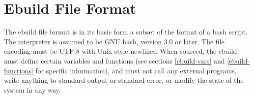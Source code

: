 \chapter{Ebuild File Format}
\label{ebuild-format}

The ebuild file format is in its basic form a subset of the format of a bash script. The interpreter
is assumed to be GNU bash, version 3.0 or later. The file encoding must be UTF-8 with Unix-style
newlines. When sourced, the
ebuild must define certain variables and functions (see sections \ref{ebuild-vars} and
\ref{ebuild-functions} for specific information), and must not call any external programs, write
anything to standard output or standard error, or modify the state of the system in any way.


